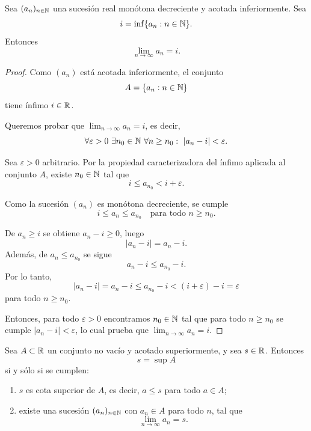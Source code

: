 \begin{prop}
Sea $(a_n)_{n\in\mathbb{N}}$ una sucesión real monótona decreciente y acotada inferiormente.
Sea
\[
i = \inf\{a_n : n \in \mathbb{N}\}.
\]
Entonces
\[
\lim_{n\to\infty} a_n = i.
\]
\end{prop}

\begin{proof}
Como $(a_n)$ está acotada inferiormente, el conjunto
\[
A = \{a_n : n \in \mathbb{N}\}
\]
tiene ínfimo $i \in \mathbb{R}$.

Queremos probar que $\lim_{n\to\infty} a_n = i$, es decir,
\[
\forall \varepsilon > 0 \ \exists n_0 \in \N \ \forall n \ge n_0:
\ |a_n - i| < \varepsilon.
\]

Sea $\varepsilon>0$ arbitrario. Por la propiedad caracterizadora del
ínfimo aplicada al conjunto $A$, existe $n_0 \in \mathbb{N}$ tal que
\[
i \le a_{n_0} < i + \varepsilon.
\]

Como la sucesión $(a_n)$ es monótona decreciente, se cumple
\[
i \le a_n \le a_{n_0} \quad \text{para todo } n \ge n_0.
\]

De $a_n \ge i$ se obtiene $a_n - i \ge 0$, luego
\[
|a_n - i| = a_n - i.
\]
Además, de $a_n \le a_{n_0}$ se sigue
\[
a_n - i \le a_{n_0} - i.
\]
Por lo tanto,
\[
|a_n - i|
= a_n - i
\le a_{n_0} - i
< (i + \varepsilon) - i
= \varepsilon
\]
para todo $n \ge n_0$.

Entonces, para todo $\varepsilon>0$ encontramos $n_0 \in \mathbb{N}$ tal que
para todo $n \ge n_0$ se cumple $|a_n - i|<\varepsilon$, lo cual prueba
que $\lim_{n\to\infty} a_n = i$.
\end{proof}

\begin{prop}
Sea $A \subset \mathbb{R}$ un conjunto no vacío y acotado superiormente, y sea $s \in \mathbb{R}$.
Entonces
\[
s = \sup A
\]
si y sólo si se cumplen:
\begin{enumerate}[label=(\roman*)]
    \item $s$ es cota superior de $A$, es decir, $a \le s$ para todo $a \in A$;
    \item existe una sucesión $(a_n)_{n\in\mathbb{N}}$ con $a_n \in A$ para todo $n$, tal que
    \[
    \lim_{n\to\infty} a_n = s.
    \]
\end{enumerate}
\end{prop}


